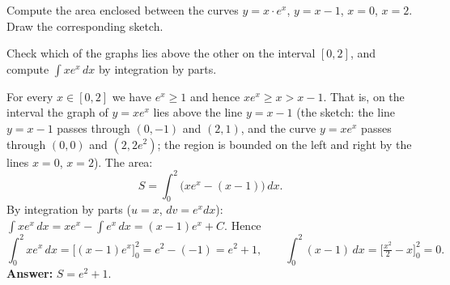 
\begin{question}
Compute the area enclosed between the curves $y=x\cdot e^x$, $y=x-1$, $x=0$, $x=2$. Draw the corresponding sketch.
\end{question}

\begin{hint}
Check which of the graphs lies above the other on the interval $[0,2]$, and compute $\int xe^x\,dx$ by integration by parts.
\end{hint}

\begin{solution}
For every $x\in[0,2]$ we have $e^x\ge1$ and hence $xe^x\ge x>x-1$. That is, on the interval the graph of $y=xe^x$ lies above the line $y=x-1$ (the sketch: the line $y=x-1$ passes through $(0,-1)$ and $(2,1)$, and the curve $y=xe^x$ passes through $(0,0)$ and $(2,2e^2)$; the region is bounded on the left and right by the lines $x=0$, $x=2$). The area:
\[ S=\int_0^2\big(xe^x-(x-1)\big)\,dx. \]
By integration by parts ($u=x$, $dv=e^xdx$): $\int xe^x\,dx=xe^x-\int e^x\,dx=(x-1)e^x+C$. Hence
\[ \int_0^2 xe^x\,dx=\big[(x-1)e^x\big]_0^2=e^2-(-1)=e^2+1, \qquad \int_0^2(x-1)\,dx=\Big[\tfrac{x^2}{2}-x\Big]_0^2=0. \]
\textbf{Answer:} $S=e^2+1$.
\end{solution}

